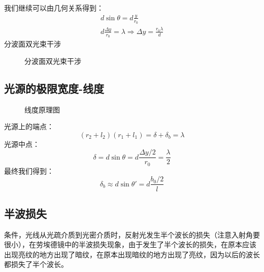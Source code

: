 \documentclass[UFT8]{article}
\begin{document}
我们继续可以由几何关系得到：
\begin{align*}
d\sin \theta=d\frac{y}{r_0}\\
d\frac{\Delta y}{r_0}=\lambda\Rightarrow\Delta y=\frac{r_0\lambda}{d}
\end{align*}
分波面双光束干涉
\begin{figure}[htpb]
\begin{center}
\end{center}
\caption{分波面双光束干涉}
\end{figure}

\subsection{光源的极限宽度-线度}
\begin{figure}[htpb]
\begin{center}
\end{center}
\caption{线度原理图}
\end{figure}

光源上的端点：
\[
	(r_2+l_2)(r_1+l_1)=\delta+\delta_b=\lambda
\]
光源中点：
\[
	\delta=d\sin \theta=d\frac{\Delta y/2}{r_0}=\frac{\lambda}{2}
\]
最终我们得到：
\[
	\delta_b\approx d\sin\theta'=d\frac{b_0/2}{l}
\]
\subsection{半波损失}
条件，光线从光疏介质到光密介质时，反射光发生半个波长的损失（注意入射角要很小），在劳埃德镜中的半波损失现象，由于发生了半个波长的损失，在原本应该出现亮纹的地方出现了暗纹，在原本出现暗纹的地方出现了亮纹，因为以后的波长都损失了半个波长。
\end{document}
